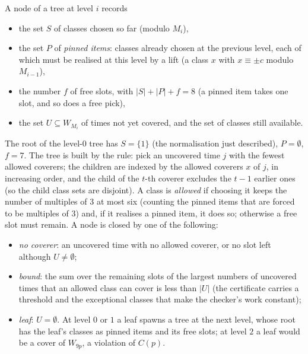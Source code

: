 \documentclass[11pt]{article}
\theoremstyle{remark}
\begin{document}
A node of a tree at level $i$ records
\begin{itemize}
\item the set $S$ of classes chosen so far (modulo $M_i$),
\item the set $P$ of \emph{pinned items}: classes already chosen at the previous level, each of which must be realised at this level by a lift (a class $x$ with $x\equiv\pm c$ modulo $M_{i-1}$),
\item the number $f$ of free slots, with $|S|+|P|+f=8$ (a pinned item takes one slot, and so does a free pick),
\item the set $U\subseteq W_{M_i}$ of times not yet covered, and the set of classes still available.
\end{itemize}
The root of the level-$0$ tree has $S=\{1\}$ (the normalisation just described), $P=\emptyset$, $f=7$. The tree is built by the rule: pick an uncovered time $j$ with the fewest allowed coverers; the children are indexed by the allowed coverers $x$ of $j$, in increasing order, and the child of the $t$-th coverer excludes the $t-1$ earlier ones (so the child class sets are disjoint). A class is \emph{allowed} if choosing it keeps the number of multiples of $3$ at most six (counting the pinned items that are forced to be multiples of $3$) and, if it realises a pinned item, it does so; otherwise a free slot must remain. A node is closed by one of the following:
\begin{itemize}
\item \emph{no coverer}: an uncovered time with no allowed coverer, or no slot left although $U\neq\emptyset$;
\item \emph{bound}: the sum over the remaining slots of the largest numbers of uncovered times that an allowed class can cover is less than $|U|$ (the certificate carries a threshold and the exceptional classes that make the checker's work constant);
\item \emph{leaf}: $U=\emptyset$. At level $0$ or $1$ a leaf spawns a tree at the next level, whose root has the leaf's classes as pinned items and its free slots; at level $2$ a leaf would be a cover of $W_{9p}$, a violation of $C(p)$.
\end{itemize}
\end{document}
